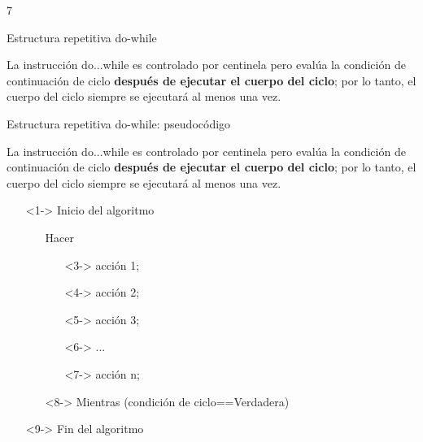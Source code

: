 7\documentclass[xcolor=pdftex,table,11pt]{beamer}
\begin{document}
\begin{frame}
\codesetstylefrombeamer
{}
\end{frame}




\begin{frame}{Estructura repetitiva do-while}
\begin{block}{}
La instrucción do...while es controlado por centinela pero evalúa la condición de continuación de ciclo \textbf{después de ejecutar el cuerpo del ciclo}; por lo tanto, el cuerpo del ciclo siempre se ejecutará al menos una vez.
\end{block}

\end{frame}




\begin{frame}{Estructura repetitiva do-while: pseudocódigo}
\begin{block}{}
La instrucción do...while es controlado por centinela pero evalúa la condición de continuación de ciclo \textbf{después de ejecutar el cuerpo del ciclo}; por lo tanto, el cuerpo del ciclo siempre se ejecutará al menos una vez.
\end{block}


\begin{itemize}
   \item[]<1-> Inicio del algoritmo

   \begin{itemize}
   		\item[]Hacer
     	\begin{itemize}
     			\item[]<3->  acción 1;
     			\item[]<4->  acción 2;
     			\item[]<5->  acción 3;
     			\item[]<6->  ...
     			\item[]<7->  acción n;
     	\end{itemize}
     	\item[]<8-> Mientras (condición de ciclo==Verdadera)
   \end{itemize}
   
  \item[]<9-> Fin del algoritmo 
  
  
\end{itemize}



\end{frame}
\end{document}
